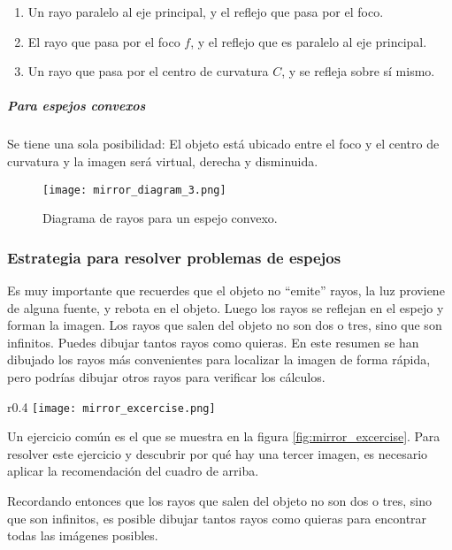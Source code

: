 \begin{enumerate}
  \item Un rayo paralelo al eje principal, y el reflejo que pasa por el foco.
  \item El rayo que pasa por el foco \(f\), y el reflejo que es paralelo al eje principal.
  \item Un rayo que pasa por el centro de curvatura \(C\), y se refleja sobre sí mismo.
\end{enumerate}

\subparagraph{Para espejos convexos}

Se tiene una sola posibilidad: El objeto está ubicado entre el foco y el centro de curvatura y la imagen será virtual, derecha y disminuida.

\begin{figure}[ht]
  \centering
  \texttt{[image: mirror\_diagram\_3.png]}
  \caption{Diagrama de rayos para un espejo convexo.}
  \label{fig:mirror_diagram_3}
\end{figure}

\subsubsection{Estrategia para resolver problemas de espejos}

\begin{tcolorbox}[interesting_data, title=Recuerda]
  Es muy importante que recuerdes que el objeto no ``emite'' rayos, la luz proviene de alguna fuente, y rebota en el objeto. Luego los rayos se reflejan en el espejo y forman la imagen.
  Los rayos que salen del objeto no son dos o tres, sino que son infinitos. Puedes dibujar tantos rayos como quieras. En este resumen se han dibujado los rayos más convenientes para localizar la imagen de forma rápida, pero podrías dibujar otros rayos para verificar los cálculos.
\end{tcolorbox}

\begin{wrapfigure}{r}{0.4\textwidth}
  \centering
  \texttt{[image: mirror\_excercise.png]}
  \caption{Dos espejos ubicados a 90 grados entre sí.}
  \label{fig:mirror_excercise}
\end{wrapfigure}
Un ejercicio común es el que se muestra en la figura \ref{fig:mirror_excercise}. Para resolver este ejercicio y descubrir por qué hay una tercer imagen, es necesario aplicar la recomendación del cuadro de arriba. 

Recordando entonces que los rayos que salen del objeto no son dos o tres, sino que son infinitos, es posible dibujar tantos rayos como quieras para encontrar todas las imágenes posibles.

